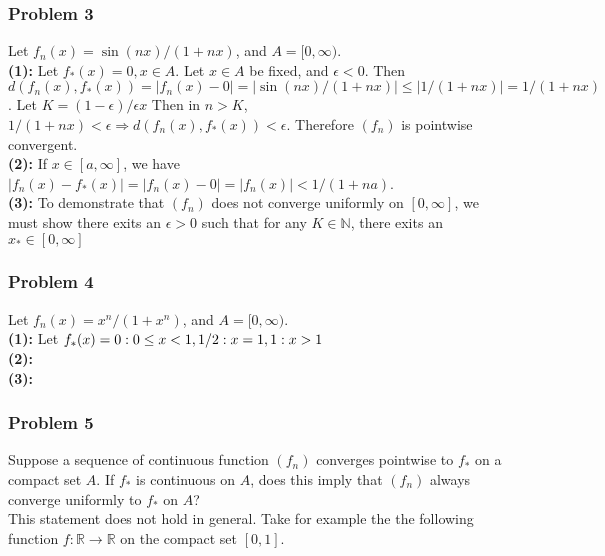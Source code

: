 \documentclass{article}
\newcommand{\N}{\mathbb{N}}
\newcommand{\R}{\mathbb{R}}
\begin{document}
\subsubsection*{Problem 3}
Let $f_n(x) = \sin(nx) / (1 + nx)$, and $A = [0, \infty)$. \\

\noindent \textbf{(1):} Let $f_*(x) = 0, x \in A$. Let $x \in A$ be fixed, and $\epsilon < 0$. Then $d(f_n(x), f_*(x)) = |f_n(x) - 0| = |\sin(nx)/(1+nx)| \leq |1/(1+nx)| = 1 / (1+nx)$. Let $K = (1 - \epsilon) / \epsilon x$ Then in $n > K$, $1/(1+nx) < \epsilon \Rightarrow d(f_n(x), f_*(x)) < \epsilon$. Therefore $(f_n)$ is pointwise convergent.\\

\noindent \textbf{(2):} If $x \in [a, \infty]$, we have $|f_n(x) - f_*(x)| = |f_n(x) - 0| = |f_n(x)| < 1 /(1+na)$.\\

\noindent \textbf{(3):} To demonstrate that $(f_n)$ does not converge uniformly on $[0, \infty]$, we must show there exits an $\epsilon > 0$ such that for any $K \in \N$, there exits an $x_* \in [0, \infty]$\\

\subsubsection*{Problem 4}
Let $f_n(x) = x^n / (1 + x^n)$, and $A = [0, \infty)$. \\

\noindent \textbf{(1):} Let $f_*(x) = \\
0 : 0 \leq x < 1, \\
1/2 : x = 1, \\
1: x > 1$ \\

\noindent \textbf{(2):} \\

\noindent \textbf{(3):} \\

\subsubsection*{Problem 5}
Suppose a sequence of continuous function $(f_n)$ converges pointwise to $f_*$ on a compact set $A$. If $f_*$ is continuous on $A$, does this imply that $(f_n)$ always converge uniformly to $f_*$ on $A$?\\

This statement does not hold in general. Take for example the the following function $f : \R \rightarrow \R$ on the compact set $[0, 1]$.
\end{document}
